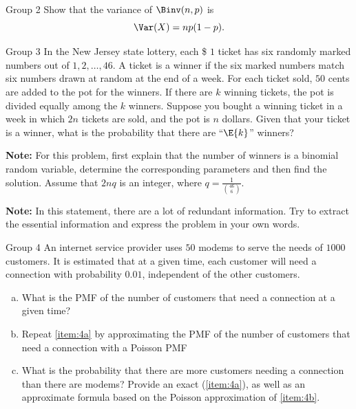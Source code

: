 \documentclass{article}
\theoremstyle{plain}
\theoremstyle{definition}
\theoremstyle{remark}
\begin{document}
\begin{problem}
    {Group 2}
    Show that the variance of $\Binv(n,p)$ is
    \[\Var(X)=np(1-p).\]
\end{problem}

\begin{problem}
    {Group 3}
    In the New Jersey state lottery, each \$ $1$ ticket has six randomly marked numbers out of $1, 2, \dots , 46$. A ticket is a winner if the six marked numbers match six numbers drawn at random at the end of a week. For each ticket sold, $50$ cents are added to the pot for the winners. If there are $k$ winning tickets, the pot is divided equally among the $k$ winners. Suppose you bought a winning ticket in a week in which $2n$ tickets are sold, and the pot is $n$ dollars. Given that your ticket is a winner, what is the probability that there are ``$\E{k}$'' winners?

    \textbf{Note:} For this problem, first explain that the number of winners is a binomial random variable, determine the corresponding parameters and then find the solution. Assume that $2nq$ is an integer, where $q=\frac{1}{\binom{46}{6}}$.

    \textbf{Note:} In this statement, there are a lot of redundant information. Try to extract the essential information and express the problem in your own words.
\end{problem}

\begin{problem}
    {Group 4}
    An internet service provider uses $50$ modems to serve the needs of $1000$ customers. It is estimated that at a given time, each customer will need a connection with probability $0.0 1$, independent of the other customers.
    \begin{enumerate}[(a)]
        \item What is the PMF of the number of customers that need a connection at a given time?\label{item:4a}
        \item Repeat \cref{item:4a} by approximating the PMF of the number of customers that need a connection with a Poisson PMF\label{item:4b}
        \item What is the probability that there are more customers needing a connection than there are modems? Provide an exact (\cref{item:4a}), as well as an approximate formula based on the Poisson approximation of \cref{item:4b}.
    \end{enumerate}
\end{problem}
\end{document}
